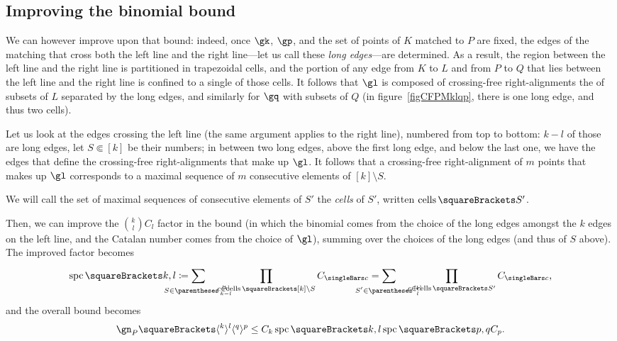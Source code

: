 \documentclass[10pt, a4paper, twoside]{basestyle}
\DeclareMathOperator{\cells}{cells}
\DeclareMathOperator{\spc}{spc}
\begin{document}
\subsection{Improving the binomial bound}
We can however improve upon that bound: indeed, once $\gk$, $\gp$, and the set of points
of $K$ matched to $P$ are fixed, the edges of the matching that cross both the left line
and the right line---let us call these \emph{long edges}---are determined. As a result,
the region between the left line and the
right line is partitioned in trapezoidal cells, and the portion of any edge from $K$ to $L$ and
from $P$ to $Q$ that lies between the left line and the right line is confined to a
single of those cells. It follows that $\gl$ is composed of crossing-free
right-alignments the of subsets of $L$ separated by the long edges, and similarly for $\gq$
with subsets of $Q$ (in figure~\ref{figCFPMklqp}, there is one long edge, and thus two cells).

Let us look at the edges crossing the left line (the same argument applies to the right line),
numbered from top to bottom: $k-l$ of those are
long edges, let $S \Subset [k]$ be their numbers; in between two long edges, above the first
long edge, and below the last one, we have the edges that define the crossing-free right-alignments
that make up $\gl$. It follows that a crossing-free right-alignment of $m$ points that makes up
$\gl$ corresponds to a maximal sequence of $m$ consecutive elements of $[k] \setminus S$.

We will call the set of maximal sequences of consecutive elements of $S'$ the \emph{cells} of
$S'$, written $\cells\of{S'}$.

Then, we can improve the $\binom k l C_l$ factor in the bound (in which the binomial comes from
the choice of the long edges amongst the $k$ edges on the left line, and the Catalan number comes
from the choice of $\gl$), summing over the choices of the long edges (and thus of $S$ above).
The improved factor becomes\begin{equation}
\spc\of{k, l}\DefineAs
\sum{S\in\binom{[k]}{k-l}} \quad \prod{c\in\cells\of{[k] \setminus S}}C_{\Cardinality c} =
\sum{S'\in\binom{[k]}{l}} \quad \prod{c\in\cells\of{S'}}C_{\Cardinality c}\text,
\label{spcDefinition}
\end{equation}
and the overall bound becomes\begin{equation}
\gn_P\of{\langle^k\rangle^l\langle^q\rangle^p}\leq
C_k\spc\of{k, l}\spc\of{p, q}C_p\text.\label{bound-ck-spckl-spcpq-cp}
\end{equation}
\end{document}
